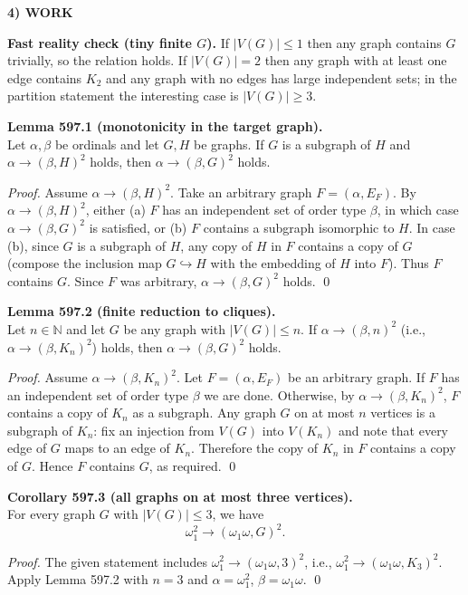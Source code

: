 \noindent\textbf{4) WORK}\par
\textbf{Fast reality check (tiny finite $G$).} If $|V(G)|\le 1$ then any graph contains $G$ trivially, so the relation holds. If $|V(G)|=2$ then any graph with at least one edge contains $K_2$ and any graph with no edges has large independent sets; in the partition statement the interesting case is $|V(G)|\ge 3$.

\medskip
\noindent\textbf{Lemma 597.1 (monotonicity in the target graph).}\\
Let $\alpha,\beta$ be ordinals and let $G,H$ be graphs. If $G$ is a subgraph of $H$ and $\alpha\to(\beta,H)^2$ holds, then $\alpha\to(\beta,G)^2$ holds.

\noindent\emph{Proof.} Assume $\alpha\to(\beta,H)^2$. Take an arbitrary graph $F=(\alpha,E_F)$.
By $\alpha\to(\beta,H)^2$, either (a) $F$ has an independent set of order type $\beta$, in which case $\alpha\to(\beta,G)^2$ is satisfied, or (b) $F$ contains a subgraph isomorphic to $H$. In case (b), since $G$ is a subgraph of $H$, any copy of $H$ in $F$ contains a copy of $G$ (compose the inclusion map $G\hookrightarrow H$ with the embedding of $H$ into $F$). Thus $F$ contains $G$. Since $F$ was arbitrary, $\alpha\to(\beta,G)^2$ holds. \qed

\medskip
\noindent\textbf{Lemma 597.2 (finite reduction to cliques).}\\
Let $n\in\mathbb{N}$ and let $G$ be any graph with $|V(G)|\le n$. If $\alpha\to(\beta,n)^2$ (i.e., $\alpha\to(\beta,K_n)^2$) holds, then $\alpha\to(\beta,G)^2$ holds.

\noindent\emph{Proof.} Assume $\alpha\to(\beta,K_n)^2$. Let $F=(\alpha,E_F)$ be an arbitrary graph.
If $F$ has an independent set of order type $\beta$ we are done. Otherwise, by $\alpha\to(\beta,K_n)^2$, $F$ contains a copy of $K_n$ as a subgraph.
Any graph $G$ on at most $n$ vertices is a subgraph of $K_n$: fix an injection from $V(G)$ into $V(K_n)$ and note that every edge of $G$ maps to an edge of $K_n$. Therefore the copy of $K_n$ in $F$ contains a copy of $G$. Hence $F$ contains $G$, as required. \qed

\medskip
\noindent\textbf{Corollary 597.3 (all graphs on at most three vertices).}\\
For every graph $G$ with $|V(G)|\le 3$, we have
\[
\omega_1^2\to(\omega_1\omega,G)^2.
\]

\noindent\emph{Proof.} The given statement includes $\omega_1^2\to(\omega_1\omega,3)^2$, i.e., $\omega_1^2\to(\omega_1\omega,K_3)^2$.
Apply Lemma 597.2 with $n=3$ and $\alpha=\omega_1^2$, $\beta=\omega_1\omega$. \qed

